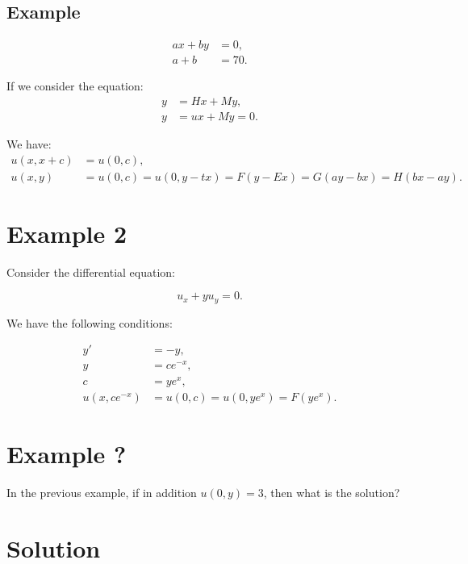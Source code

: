 \documentclass[11pt]{article}
\begin{document}
\subsection*{Example}

\begin{align}
    ax + by &= 0, \\
    a + b &= 70.
\end{align}

If we consider the equation:
\begin{align}
    y &= Hx + My, \\
    y &= ux + My = 0.
\end{align}

We have:
\begin{align}
    u(x, x + c) &= u(0, c), \\
    u(x, y) &= u(0, c) = u(0, y - tx) = F(y - Ex) = G(ay - bx) = H(bx - ay).
\end{align}





\section*{Example 2}

Consider the differential equation:

\begin{equation}
    u_x + y u_y = 0.
\end{equation}

We have the following conditions:

\begin{align}
    y' &= -y, \\
    y &= ce^{-x}, \\
    c &= y e^x, \\
    u(x, ce^{-x}) &= u(0, c) = u(0, y e^x) = F(y e^x).
\end{align}

\section*{Example ?}

In the previous example, if in addition \( u(0, y) = 3 \), then what is the solution?

\section*{Solution}
\end{document}
